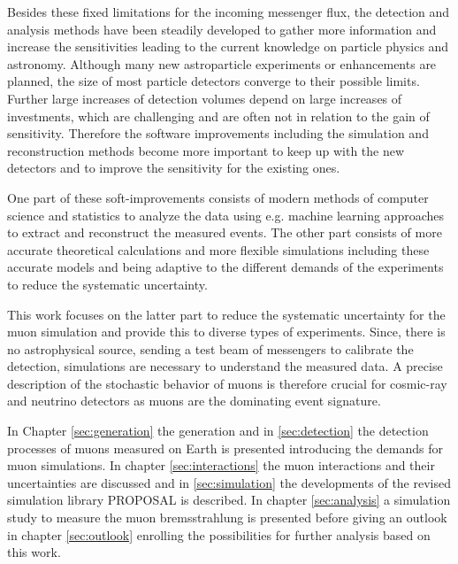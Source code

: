 Besides these fixed limitations for the incoming messenger flux, the detection and analysis methods have been steadily developed to gather more information and increase the sensitivities leading to the current knowledge on particle physics and astronomy.
Although many new astroparticle experiments or enhancements are planned, the size of most particle detectors converge to their possible limits.
Further large increases of detection volumes depend on large increases of investments, which are challenging and are often not in relation to the gain of sensitivity.
Therefore the software improvements including the simulation and reconstruction methods become more important to keep up with the new detectors and to improve the sensitivity for the existing ones.

One part of these soft-improvements consists of modern methods of computer science and statistics to analyze the data using e.g. machine learning approaches to extract and reconstruct the measured events.
The other part consists of more accurate theoretical calculations and more flexible simulations including these accurate models and being adaptive to the different demands of the experiments to reduce the systematic uncertainty.

This work focuses on the latter part to reduce the systematic uncertainty for the muon simulation and provide this to diverse types of experiments.
Since, there is no astrophysical source, sending a test beam of messengers to calibrate the detection, simulations are necessary to understand the measured data.
A precise description of the stochastic behavior of muons is therefore crucial for cosmic-ray and neutrino detectors as muons are the dominating event signature.

In Chapter \ref{sec:generation} the generation and in \ref{sec:detection} the detection processes of muons measured on Earth is presented introducing the demands for muon simulations.
In chapter \ref{sec:interactions} the muon interactions and their uncertainties are discussed and in \ref{sec:simulation} the developments of the revised simulation library PROPOSAL is described.
In chapter \ref{sec:analysis} a simulation study to measure the muon bremsstrahlung is presented before giving an outlook in chapter \ref{sec:outlook} enrolling the possibilities for further analysis based on this work.
